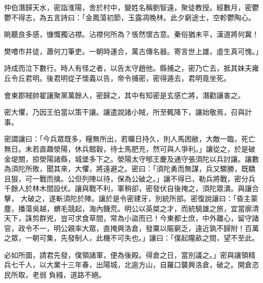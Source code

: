 \begin{pinyinscope}
 仲伯潛歸天水，密詣淮陽，舍於村中，變姓名稱劉智遠，聚徒教授。經數月，密鬱鬱不得志，為五言詩曰：「金鳳蕩初節，玉露凋晚林。此夕窮途士，空軫鬱陶心。



 眺聽良多感，慷慨獨沾襟。沾襟何所為？悵然懷古意。秦俗猶未平，漢道將何冀！



 樊噲市井徒，蕭何刀筆吏。一朝時運合，萬古傳名器。寄言世上雄，虛生真可愧。」



 詩成而泣下數行。時人有怪之者，以告太守趙他。縣捕之，密乃亡去，抵其妹夫雍丘令丘君明。後君明從子懷義以告，帝令捕密，密得遁去，君明竟坐死。



 會東郡賊帥翟讓聚黨萬餘人，密歸之，其中有知密是玄感亡將，潛勸讓害之。



 密大懼，乃因王伯當以策干讓。讓遣說諸小賊，所至輒降下，讓始敬焉，召與計事。



 密謂讓曰：「今兵眾既多，糧無所出，若曠日持久，則人馬困敝，大敵一臨，死亡無日。未若直趣滎陽，休兵館穀，待士馬肥充，然可與人爭利。」讓從之，於是破金堤關，掠滎陽諸縣，城堡多下之。滎陽太守郇王慶及通守張須陀以兵討讓。讓數為須陀所敗，聞其來，大懼，將遠避之。密曰：「須陀勇而無謀，兵又驟勝，既驕且狠，可一戰而擒。公但列陣以待，保為公破之。」讓不得已，勒兵將戰，密分兵千餘人於林木間設伏。讓與戰不利，軍稍卻，密發伏自後掩之，須陀眾潰。與讓合擊，
 大破之，遂斬須陀於陣。讓於是令密建牙，別統所部。密復說讓曰：「昏主蒙塵，播蕩吳越，蝟毛競起，海內饑荒。明公以英桀之才，而統驍雄之旅，宜當廓清天下，誅剪群兇，豈可求食草間，常為小盜而已！今東都士庶，中外離心，留守諸官，政令不一，明公親率大眾，直掩興洛倉，發粟以賑窮乏，遠近孰不歸附！百萬之眾，一朝可集，先發制人，此機不可失也。」讓曰：「僕起隴畝之間，望不至此。



 必如所圖，請君先發，僕領諸軍，便為後殿。得倉之日，當別議之。」密與讓領精兵七千人，以大業十三年春，出陽城，北逾方山，自羅口襲興洛倉，破之。開倉恣民所取，老弱
 負繦，道路不絕。




\end{pinyinscope}
